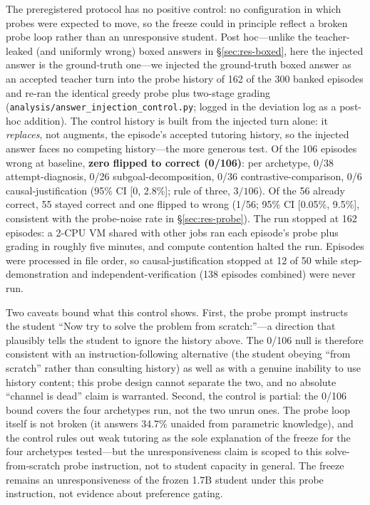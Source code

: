 \documentclass[notitlepage,12pt]{jedm}
\begin{document}
The preregistered protocol has no positive control: no configuration in
which probes were expected to move, so the freeze could in principle
reflect a broken probe loop rather than an unresponsive student. Post
hoc---unlike the teacher-leaked (and uniformly wrong) boxed answers in
\S\ref{sec:res-boxed}, here the injected answer is the ground-truth
one---we injected the ground-truth boxed answer as an accepted teacher
turn into the probe history of 162 of the 300 banked episodes and re-ran
the identical greedy probe plus two-stage grading
(\texttt{analysis/answer\_injection\_control.py}; logged in the deviation
log as a post-hoc addition). The control history is built from the
injected turn alone: it \emph{replaces}, not augments, the episode's
accepted tutoring history, so the injected answer faces no competing
history---the more generous test. Of the 106 episodes wrong at baseline,
\textbf{zero flipped to correct (0/106)}: per archetype, 0/38
attempt-diagnosis, 0/26 subgoal-decomposition, 0/36 contrastive-comparison,
0/6 causal-justification (95\% CI [0, 2.8\%]; rule of three, $3/106$). Of the 56 already correct, 55 stayed correct
and one flipped to wrong (1/56; 95\% CI [0.05\%, 9.5\%], consistent with
the probe-noise rate in \S\ref{sec:res-probe}). The run stopped at 162
episodes: a 2-CPU VM shared with other jobs ran each episode's probe plus
grading in roughly five minutes, and compute contention halted the run.
Episodes were processed in file order, so causal-justification stopped at
12 of 50 while step-demonstration and independent-verification (138
episodes combined) were never run.

Two caveats bound what this control shows. First, the probe prompt
instructs the student ``Now try to solve the problem from scratch:''---a
direction that plausibly tells the student to ignore the history above.
The 0/106 null is therefore consistent with an instruction-following
alternative (the student obeying ``from scratch'' rather than consulting
history) as well as with a genuine inability to use history content; this
probe design cannot separate the two, and no absolute ``channel is dead''
claim is warranted. Second, the control is partial: the 0/106 bound covers
the four archetypes run, not the two unrun ones. The probe loop itself is
not broken (it answers 34.7\% unaided from parametric knowledge), and the
control rules out weak tutoring as the sole explanation of the freeze for
the four archetypes tested---but the unresponsiveness claim is scoped to
this solve-from-scratch probe
instruction, not to student capacity in general. The freeze remains an
unresponsiveness of the frozen 1.7B student under this probe instruction, not evidence
about preference gating.
\end{document}
